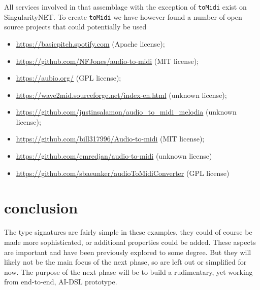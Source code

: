\documentclass[]{article}
\begin{document}
All services involved in that assemblage with the exception of
\texttt{toMidi} exist on SingularityNET.  To create \texttt{toMidi} we
have however found a number of open source projects that could
potentially be used
\begin{itemize}
\item
  \href{https://basicpitch.spotify.com}{https://basicpitch.spotify.com}
  (Apache license);
\item
  \href{https://github.com/NFJones/audio-to-midi}{https://github.com/NFJones/audio-to-midi}
  (MIT license);
\item
  \href{https://github.com/NFJones/audio-to-midi}{https://aubio.org/}
  (GPL license);
\item
  \href{https://wave2mid.sourceforge.net/index-en.html}{https://wave2mid.sourceforge.net/index-en.html}
  (unknown license);
\item
  \href{https://github.com/justinsalamon/audio\_to\_midi\_melodia}{https://github.com/justinsalamon/audio\_to\_midi\_melodia}
  (unknown license);
\item
  \href{https://github.com/bill317996/Audio-to-midi}{https://github.com/bill317996/Audio-to-midi}
  (MIT license);
\item
  \href{https://github.com/emredjan/audio-to-midi}{https://github.com/emredjan/audio-to-midi}
  (unknown license)
\item
  \href{https://github.com/sbaeunker/audioToMidiConverter}{https://github.com/sbaeunker/audioToMidiConverter}
  (GPL license)
\end{itemize}

\section{conclusion}
The type signatures are fairly simple in these examples, they could of
course be made more sophisticated, or additional properties could be
added.  These aspects are important and have been previously explored
to some degree.  But they will likely not be the main focus of the
next phase, so are left out or simplified for now.  The purpose of the
next phase will be to build a rudimentary, yet working from
end-to-end, AI-DSL prototype.
\end{document}
